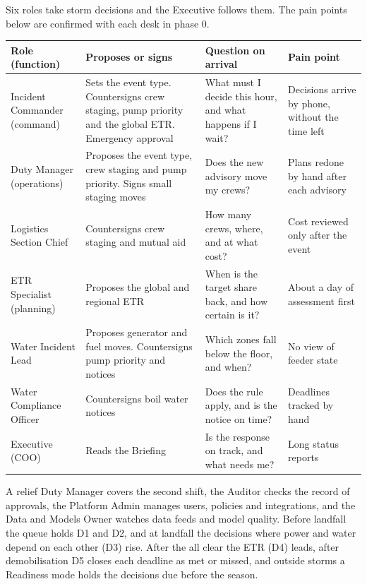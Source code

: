 \documentclass[fontsize=10pt,a4paper,DIV=12,parskip=half-,numbers=noenddot,headsepline,captions=tableheading]{scrartcl}
\begin{document}
Six roles take storm decisions and the Executive follows them. The pain points below are confirmed with each desk in phase 0.
{\footnotesize\par\noindent
\begin{tabularx}{\textwidth}{@{}L{2.9cm} L{4.2cm} Y L{3.2cm}@{}}
  \toprule
  \textbf{Role (function)} & \textbf{Proposes or signs} & \textbf{Question on arrival} & \textbf{Pain point} \\ \midrule
  Incident Commander (command) & Sets the event type. Countersigns crew staging, pump priority and the global ETR. Emergency approval & What must I decide this hour, and what happens if I wait? & Decisions arrive by phone, without the time left \\ \lightrowrule
  Duty Manager (operations) & Proposes the event type, crew staging and pump priority. Signs small staging moves & Does the new advisory move my crews? & Plans redone by hand after each advisory \\ \lightrowrule
  Logistics Section Chief & Countersigns crew staging and mutual aid & How many crews, where, and at what cost? & Cost reviewed only after the event \\ \lightrowrule
  ETR Specialist (planning) & Proposes the global and regional ETR & When is the target share back, and how certain is it? & About a day of assessment first \\ \lightrowrule
  Water Incident Lead & Proposes generator and fuel moves. Countersigns pump priority and notices & Which zones fall below the floor, and when? & No view of feeder state \\ \lightrowrule
  Water Compliance Officer & Countersigns boil water notices & Does the rule apply, and is the notice on time? & Deadlines tracked by hand \\ \lightrowrule
  Executive (COO) & Reads the Briefing & Is the response on track, and what needs me? & Long status reports \\ \bottomrule
\end{tabularx}}\par
A relief Duty Manager covers the second shift, the Auditor checks the record of approvals, the Platform Admin manages users, policies and integrations, and the Data and Models Owner watches data feeds and model quality.
Before landfall the queue holds D1 and D2, and at landfall the decisions where power and water depend on each other (D3) rise. After the all clear the ETR (D4) leads, after demobilisation D5 closes each deadline as met or missed, and outside storms a Readiness mode holds the decisions due before the season.
\end{document}
